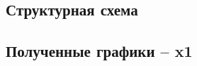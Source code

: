 \documentclass[12pt]{article}
\begin{document}
	\begin{figure}[h]
\end{figure}
	\newpage 
		\clearpage
	\subsection{Структурная схема}
\begin{figure}[h]
\end{figure}
		\clearpage
	\subsection{Полученные графики -- x1}
	
\end{document}

